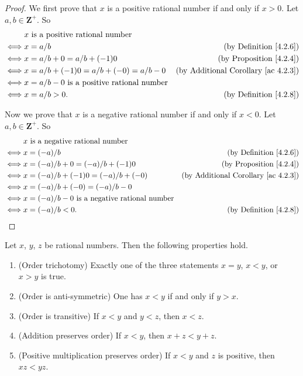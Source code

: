 \begin{proof}
We first prove that \(x\) is a positive rational number if and only if \(x > 0\).
Let \(a, b \in \mathbf{Z}^+\).
So
\begin{align*}
& x \text{ is a positive rational number} \\
\iff & x = a / b & \text{(by Definition \ref{4.2.6})} \\
\iff & x = a / b + 0 = a / b + (-1)0 & \text{(by Proposition \ref{4.2.4})} \\
\iff & x = a / b + (-1)0 = a / b + (-0) = a / b - 0 & \text{(by Additional Corollary \ref{ac 4.2.3})} \\
\iff & x = a / b - 0 \text{ is a positive rational number} \\
\iff & x = a / b > 0. & \text{(by Definition \ref{4.2.8})}
\end{align*}

Now we prove that \(x\) is a negative rational number if and only if \(x < 0\).
Let \(a, b \in \mathbf{Z}^+\).
So
\begin{align*}
& x \text{ is a negative rational number} \\
\iff & x = (-a) / b & \text{(by Definition \ref{4.2.6})} \\
\iff & x = (-a) / b + 0 = (-a) / b + (-1)0 & \text{(by Proposition \ref{4.2.4})} \\
\iff & x = (-a) / b + (-1)0 = (-a) / b + (-0) & \text{(by Additional Corollary \ref{ac 4.2.3})} \\
\iff & x = (-a) / b + (-0) = (-a) / b - 0 \\
\iff & x = (-a) / b - 0 \text{ is a negative rational number} \\
\iff & x = (-a) / b < 0. & \text{(by Definition \ref{4.2.8})}
\end{align*}
\end{proof}

\begin{proposition}\label{4.2.9}
Let \(x\), \(y\), \(z\) be rational numbers.
Then the following properties hold.
\begin{enumerate}
    \item (Order trichotomy)
    Exactly one of the three statements \(x = y\), \(x < y\), or \(x > y\) is true.
    \item (Order is anti-symmetric)
    One has \(x < y\) if and only if \(y > x\).
    \item (Order is transitive)
    If \(x < y\) and \(y < z\), then \(x < z\).
    \item (Addition preserves order)
    If \(x < y\), then \(x + z < y + z\).
    \item (Positive multiplication preserves order)
    If \(x < y\) and \(z\) is positive, then \(xz < yz\).
\end{enumerate}
\end{proposition}

